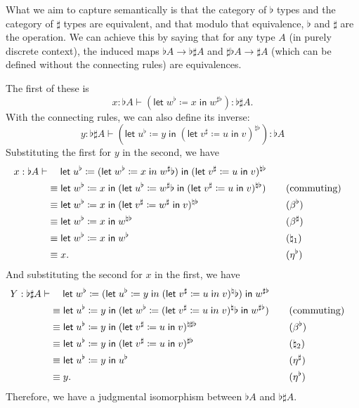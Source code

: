 \documentclass{amsart}
\def\flet#1:=#2in{\mathsf{let}\;#1 \coloneqq #2\;\mathsf{in}\;}
\begin{document}
What we aim to capture semantically is that the category of $\flat$ types and the category of $\sharp$ types are equivalent, and that modulo that equivalence, $\flat$ and $\sharp$ are the operation.
We can achieve this by saying that for any type $A$ (in purely discrete context), the induced maps $\flat A \to \flat\sharp A$ and $\sharp\flat A \to \sharp A$ (which can be defined without the connecting rules) are equivalences.

The first of these is
\[ x:\flat A \vdash (\flet w^\flat := x in w^{\sharp\flat}):\flat\sharp A. \]
With the connecting rules, we can also define its inverse:
\[ y:\flat\sharp A \vdash (\flet u^\flat := y in (\flet v^\sharp := u in v)^{\natural\flat}):\flat A \]
Substituting the first for $y$ in the second, we have
\begin{alignat*}{2}
  x:\flat A\vdash &\hspace{3ex} \flet u^\flat := (\flet w^\flat := x in w^{\sharp\flat}) in (\flet v^\sharp := u in v)^{\natural\flat}\\
  &\equiv \flet w^\flat := x in (\flet u^\flat := w^{\sharp\flat} in (\flet v^\sharp := u in v)^{\natural\flat})
  &&\quad \text{(commuting)}\\
  &\equiv \flet w^\flat := x in (\flet v^\sharp := w^\sharp in v)^{\natural\flat}
  &&\quad (\beta^\flat)\\
  &\equiv \flet w^\flat := x in w^{\natural\flat}
  &&\quad (\beta^\sharp)\\
  &\equiv \flet w^\flat := x in w^{\flat}
  &&\quad (\natural_1)\\
  &\equiv x.
  &&\quad (\eta^\flat)
\end{alignat*}
And substituting the second for $x$ in the first, we have
\begin{alignat*}{2}
  Y:\flat\sharp A \vdash &\hspace{3ex} \flet w^\flat := (\flet u^\flat := y in (\flet v^\sharp := u in v)^{\natural\flat}) in w^{\sharp\flat}\\
  &\equiv \flet u^\flat := y in (\flet w^\flat := (\flet v^\sharp := u in v)^{\natural\flat} in w^{\sharp\flat})
  &&\quad \text{(commuting)}\\
  &\equiv \flet u^\flat := y in (\flet v^\sharp := u in v)^{\natural\sharp\flat}
  &&\quad (\beta^\flat)\\
  &\equiv \flet u^\flat := y in (\flet v^\sharp := u in v)^{\sharp\flat}
  &&\quad (\natural_2)\\
  &\equiv \flet u^\flat := y in u^{\flat}
  &&\quad (\eta^\sharp)\\
  &\equiv y.
  &&\quad (\eta^\flat)
\end{alignat*}
Therefore, we have a judgmental isomorphism between $\flat A$ and $\flat\sharp A$.
\end{document}

